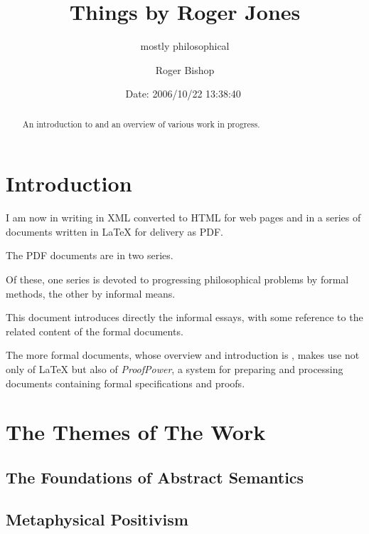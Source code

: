 \documentclass[numreferences]{rbjk}
\begin{document}
                                                                                   
\begin{article}
\begin{opening}  
\title{Things by Roger Jones}
\subtitle{mostly philosophical}
\author{Roger Bishop }
\date{$ $Date: 2006/10/22 13:38:40 $ $}

\begin{abstract}
An introduction to and an overview of various work in progress.
\end{abstract}

\end{opening}

\setcounter{tocdepth}{4}
{\parskip=0pt\tableofcontents}

\section{Introduction}

I am now in writing in XML converted to HTML for web pages and in a
series of documents written in LaTeX for delivery as PDF.

The PDF documents are in two series.

Of these, one series is devoted to progressing philosophical problems
by formal methods, the other by informal means.

This document introduces directly the informal essays, with some
reference to the related content of the formal documents.

The more formal documents, whose overview and introduction is \cite{rbjt000}, makes use not only of {\LaTeX} but also of {\it ProofPower}, a system for preparing and processing documents containing formal specifications and proofs.

\section{The Themes of The Work}

\subsection{The Foundations of Abstract Semantics}

\subsection{Metaphysical Positivism}


\end{article}
\end{document}
